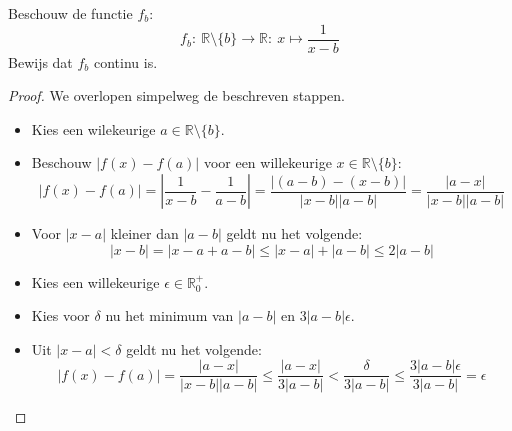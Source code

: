 \documentclass[main.tex]{subfiles}
\begin{document}
Beschouw de functie $f_{b}$:
\[ f_{b}:\ \mathbb{R}\setminus \{ b \} \rightarrow \mathbb{R}:\ x \mapsto \frac{1}{x-b} \]
Bewijs dat $f_{b}$ continu is.

\begin{proof}
  We overlopen simpelweg de beschreven stappen.
  \begin{itemize}
  \item Kies een wilekeurige $a \in \mathbb{R}\setminus \{ b \}$.
  \item Beschouw $|f(x)-f(a)|$ voor een willekeurige $x \in \mathbb{R}\setminus \{ b \}$:
    \[ |f(x)-f(a)| = \left|\frac{1}{x-b} - \frac{1}{a-b}\right| = \frac{|(a-b) - (x-b)|}{|x-b||a-b|} = \frac{|a-x|}{|x-b||a-b|} \]
  \item Voor $|x-a|$ kleiner dan $|a-b|$ geldt nu het volgende:
    \[ |x-b| = |x-a+a-b| \le |x-a|+|a-b| \le 2|a-b| \]
  \item Kies een willekeurige $\epsilon \in \mathbb{R}_{0}^{+}$.
  \item Kies voor $\delta$ nu het minimum van $|a-b|$ en $3|a-b|\epsilon$.
  \item Uit $|x-a| < \delta$ geldt nu het volgende:
    \[ |f(x)-f(a)| = \frac{|a-x|}{|x-b||a-b|} \le \frac{|a-x|}{3|a-b|} < \frac{\delta}{3|a-b|} \le \frac{3|a-b|\epsilon}{3|a-b|} = \epsilon \]
  \end{itemize}
\end{proof}
\feed
\end{document}
